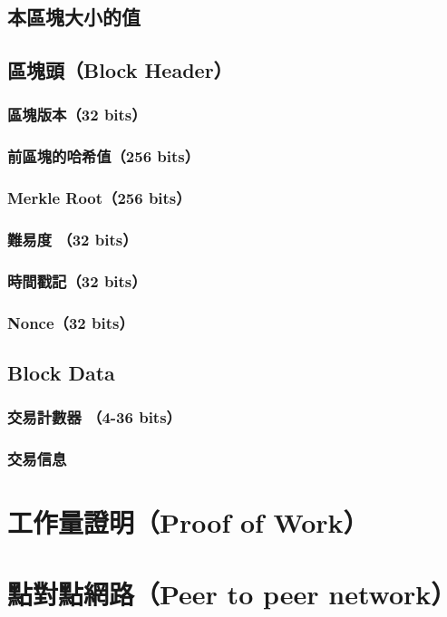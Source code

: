 		\subsection{本區塊大小的值 }
		\subsection{區塊頭（Block Header）}
			\subsubsection{區塊版本（32 bits）}
			\subsubsection{前區塊的哈希值（256 bits）}
			\subsubsection{Merkle Root（256 bits）}
			\subsubsection{難易度 （32 bits）}
			\subsubsection{時間戳記（32 bits）}
			\subsubsection{Nonce（32 bits）}

		\subsection{Block Data}
			\subsubsection{交易計數器 （4-36 bits）}
			\subsubsection{交易信息}

	\section{工作量證明（Proof of Work）}
	\section{點對點網路（Peer to peer network）}

